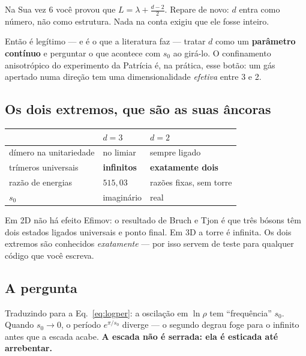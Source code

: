 \documentclass[11pt,a4paper]{article}
\begin{document}
Na Sua vez 6 você provou que $L = \lambda + \frac{d-2}{2}$. Repare de novo:
$d$ entra como número, não como estrutura. Nada na conta exigiu que ele fosse
inteiro.

Então é legítimo --- e é o que a literatura faz --- tratar $d$ como um
\textbf{parâmetro contínuo} e perguntar o que acontece com $s_{0}$ ao girá-lo. O
confinamento anisotrópico do experimento da Patrícia é, na prática, esse botão: um
gás apertado numa direção tem uma dimensionalidade \emph{efetiva} entre 3 e 2.

\subsection*{Os dois extremos, que são as suas âncoras}

\begin{center}
\begin{tabular}{@{}lll@{}}
\toprule
 & $d=3$ & $d=2$ \\
\midrule
dímero na unitariedade & no limiar & sempre ligado \\
trímeros universais    & \textbf{infinitos} & \textbf{exatamente dois} \\
razão de energias      & $515{,}03$ & razões fixas, sem torre \\
$s_{0}$                & imaginário & real \\
\bottomrule
\end{tabular}
\end{center}

Em 2D não há efeito Efimov: o resultado de Bruch e Tjon é que três bósons têm dois
estados ligados universais e ponto final. Em 3D a torre é infinita. Os dois extremos
são conhecidos \emph{exatamente} --- por isso servem de teste para qualquer código
que você escreva.

\subsection*{A pergunta}

\begin{center}
\end{center}

Traduzindo para a Eq.~\eqref{eq:logper}: a oscilação em $\ln\rho$ tem ``frequência''
$s_{0}$. Quando $s_{0}\to 0$, o período $e^{\pi/s_{0}}$ diverge --- o segundo degrau
foge para o infinito antes que a escada acabe. \textbf{A escada não é serrada: ela é
esticada até arrebentar.}
\end{document}
